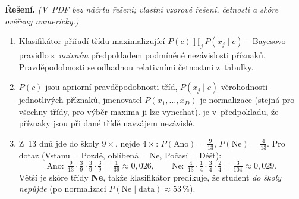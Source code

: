 \medskip
\noindent\textbf{Řešení.} \textit{(V~PDF bez náčrtu řešení; vlastní vzorové řešení, četnosti a skóre ověřeny numericky.)}\par
\begin{enumerate}[nosep]
  \item Klasifikátor přiřadí třídu maximalizující $P(c)\prod_j P(x_j\mid c)$ -- Bayesovo pravidlo s~\emph{naivním} předpokladem podmíněné nezávislosti příznaků. Pravděpodobnosti se odhadnou relativními četnostmi z~tabulky.
  \item $P(c)$ jsou apriorní pravděpodobnosti tříd, $P(x_j\mid c)$ věrohodnosti jednotlivých příznaků, jmenovatel $P(x_1,\dots,x_D)$ je normalizace (stejná pro všechny třídy, pro výběr maxima ji lze vynechat).  je v~předpokladu, že příznaky jsou při dané třídě navzájem nezávislé.
  \item Z~13 dnů jde do školy $9\times$, nejde $4\times$: $P(\text{Ano})=\tfrac{9}{13}$, $P(\text{Ne})=\tfrac{4}{13}$. Pro dotaz (Vstanu${=}$Pozdě, oblíbená${=}$Ne, Počasí${=}$Déšť):
  \[ \text{Ano}:\ \tfrac{9}{13}\cdot\tfrac39\cdot\tfrac39\cdot\tfrac39=\tfrac{1}{39}\approx 0{,}026,\qquad
     \text{Ne}:\ \tfrac{4}{13}\cdot\tfrac14\cdot\tfrac34\cdot\tfrac24=\tfrac{3}{104}\approx 0{,}029. \]
  Větší je skóre třídy \textbf{Ne}, takže klasifikátor predikuje, že student \emph{do školy nepůjde} (po normalizaci $P(\text{Ne}\mid\text{data})\approx 53\,\%$).
\end{enumerate}
